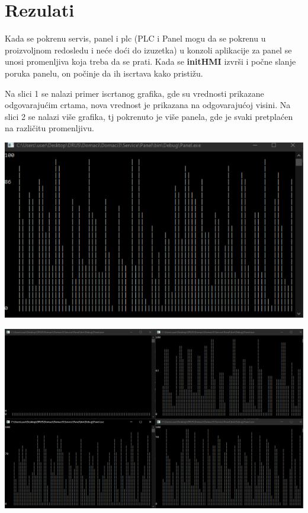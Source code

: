 \documentclass[11pt]{article}
\begin{document}
\section{Rezulati}
Kada se pokrenu servis, panel i plc (PLC i Panel mogu da se pokrenu u
proizvoljnom redosledu i neće doći do izuzetka) u konzoli aplikacije za panel
se unosi promenljiva koja treba da se prati.
Kada se \textbf{initHMI} izvrši i počne slanje poruka panelu, on počinje da ih
iscrtava kako pristižu.
\par Na slici 1 se nalazi primer iscrtanog grafika, gde su vrednosti prikazane
odgovarajućim crtama, nova vrednost je prikazana na odgovarajućoj visini.
Na slici 2 se nalazi više grafika, tj pokrenuto je više panela, gde je svaki
pretplaćen na različitu promenljivu.
\begin{center}
	\includegraphics[scale=1]{figs/jedan_grafik.PNG}
\end{center}
\begin{center}
	\includegraphics[scale=0.44]{figs/Rezultat.PNG}
\end{center}
\end{document}
